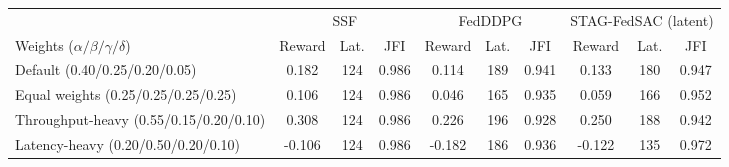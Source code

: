 \begin{tabular}{lccccccccc}
\toprule
 & \multicolumn{3}{c}{SSF} & \multicolumn{3}{c}{FedDDPG} & \multicolumn{3}{c}{STAG-FedSAC (latent)} \\
\cmidrule(lr){2-4}\cmidrule(lr){5-7}\cmidrule(lr){8-10}
Weights ($\alpha/\beta/\gamma/\delta$) & Reward & Lat. & JFI & Reward & Lat. & JFI & Reward & Lat. & JFI \\
\midrule
Default (0.40/0.25/0.20/0.05) & 0.182 & 124 & 0.986 & 0.114 & 189 & 0.941 & 0.133 & 180 & 0.947 \\
Equal weights (0.25/0.25/0.25/0.25) & 0.106 & 124 & 0.986 & 0.046 & 165 & 0.935 & 0.059 & 166 & 0.952 \\
Throughput-heavy (0.55/0.15/0.20/0.10) & 0.308 & 124 & 0.986 & 0.226 & 196 & 0.928 & 0.250 & 188 & 0.942 \\
Latency-heavy (0.20/0.50/0.20/0.10) & -0.106 & 124 & 0.986 & -0.182 & 186 & 0.936 & -0.122 & 135 & 0.972 \\
\bottomrule
\end{tabular}
